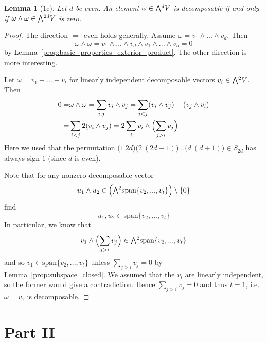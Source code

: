\documentclass{scrartcl}
\newcommand{\extpow}{\mathchoice{{\textstyle\bigwedge}}
    {{\bigwedge}}
    {{\textstyle\wedge}}
    {{\scriptstyle\wedge}}}
\newcommand{\vspan}{\mathrm{span}}
\newtheorem{lemma}[definition]{Lemma}
\begin{document}
\begin{lemma}[1c]
    Let $d$ be even.
    An element $\omega \in \extpow^d V$ is decomposable if and only if $\omega \wedge \omega \in \extpow^{2d} V$ is zero.
\end{lemma}
\begin{proof}
    The direction $\Rightarrow$ even holds generally. Assume $\omega = v_1 \wedge ... \wedge v_d$.
    Then
    \begin{equation*}
        \omega \wedge \omega = v_1 \wedge ... \wedge v_d \wedge v_1 \wedge ... \wedge v_d = 0
    \end{equation*}
    by Lemma~\ref{prop:basic_properties_exterior_product}. 
    The other direction is more interesting.

    Let $\omega = v_1 + ... + v_t$ for linearly independent decomposable vectors $v_i \in \extpow^2 V$.
    Then
    \begin{align*}
        0 =& \omega \wedge \omega = \sum_{i, j} v_i \wedge v_j = \sum_{i < j} (v_i \wedge v_j) + (v_j \wedge v_i) \\
        =& \sum_{i < j} 2(v_i \wedge v_j) = 2\sum_i v_i \wedge \Bigl( \sum_{j > i} v_j \Bigr)
    \end{align*}
    Here we used that the permutation $\bigl(1 \ 2d\bigr)\bigl(2 \ (2d - 1)\bigr)...\bigl(d \ (d + 1)\bigr) \in S_{2d}$ has always sign $1$ (since $d$ is even).

    Note that for any nonzero decomposable vector
    \begin{equation*}
        u_1 \wedge u_2 \in \Bigl( \extpow^2 \vspan\{v_2, ..., v_t\} \Bigr) \setminus \{0\}
    \end{equation*}
    find
    \begin{equation*}
        u_1, u_2 \in \vspan\{v_2, ..., v_t\}
    \end{equation*}
    In particular, we know that
    \begin{equation*}
        v_1 \wedge \Bigl( \sum_{j > i} v_j \Bigr) \in \extpow^2 \vspan\{v_2, ..., v_t\}
    \end{equation*}
    and so $v_1 \in \vspan\{v_2, ..., v_t\}$ unless $\sum_{j > i} v_j = 0$ by Lemma~\ref{prop:subspace_closed}.
    We assumed that the $v_i$ are linearly independent, so the former would give a contradiction.
    Hence $\sum_{j > i} v_j = 0$ and thus $t = 1$, i.e. $\omega = v_1$ is decomposable.
\end{proof}

\section{Part II}
\end{document}
